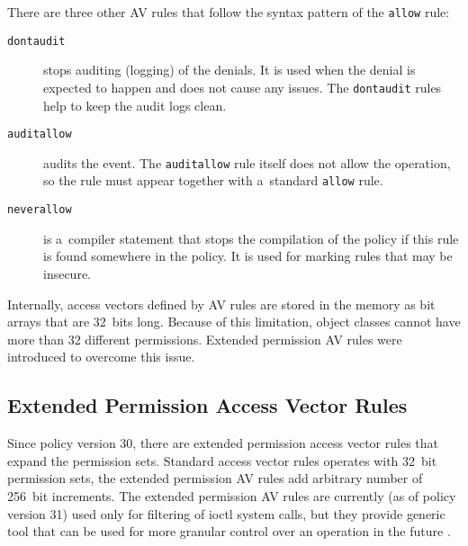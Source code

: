 There are three other AV rules that follow the syntax pattern of the
\texttt{allow} rule:
\begin{description}
    \item [\texttt{dontaudit}] stops auditing (logging) of the denials. It is
        used when the denial is expected to happen and does not cause any
        issues. The \texttt{dontaudit} rules help to keep the audit logs clean.
    \item [\texttt{auditallow}] audits the event. The \texttt{auditallow} rule
        itself does not allow the operation, so the rule must appear together
        with a~standard \texttt{allow} rule.
    \item [\texttt{neverallow}] is a~compiler statement that stops the
        compilation of the policy if this rule is found somewhere in the policy.
        It is used for marking rules that may be insecure.
\end{description}
Internally, access vectors defined by AV rules are stored in the memory as bit
arrays that are 32~bits long. Because of this limitation, object classes cannot
have more than 32 different permissions. Extended permission AV rules were
introduced to overcome this issue.

\subsection{Extended Permission Access Vector Rules}
\label{extavrules}

Since policy version 30, there are extended permission access vector rules that
expand the permission sets. Standard access vector rules operates with 32~bit
permission sets, the extended permission AV rules add arbitrary number of
256~bit increments. The extended permission AV rules are currently (as of policy
version 31) used only for filtering of ioctl system calls, but they provide
generic tool that can be used for more granular control over an operation in the
future \cite{selinuxmailxperms}.

